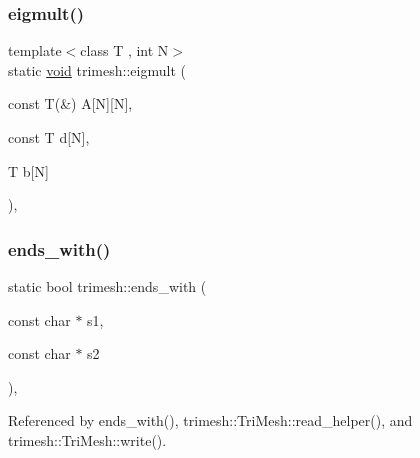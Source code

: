 \mbox{\label{namespacetrimesh_a166e0e76af0db363be9afa67f378a08f}} 
\subsubsection{\texorpdfstring{eigmult()}{eigmult()}\hspace{0.1cm}{\footnotesize\ttfamily [2/2]}}
{\footnotesize\ttfamily template$<$class T , int N$>$ \\
static \hyperlink{namespacetrimesh_a784ddfd979e1c579bda795a8edfc3f43}{void} trimesh\+::eigmult (\begin{DoxyParamCaption}\item[{const T(\&)}]{A\mbox{[}\+N\mbox{]}\mbox{[}\+N\mbox{]},  }\item[{const T}]{d\mbox{[}\+N\mbox{]},  }\item[{T}]{b\mbox{[}\+N\mbox{]} }\end{DoxyParamCaption})\hspace{0.3cm}{\ttfamily [inline]}, {\ttfamily [static]}}

\mbox{\label{namespacetrimesh_a926d2d6035db34c335f52af68daa3238}} 
\subsubsection{\texorpdfstring{ends\+\_\+with()}{ends\_with()}\hspace{0.1cm}{\footnotesize\ttfamily [1/2]}}
{\footnotesize\ttfamily static bool trimesh\+::ends\+\_\+with (\begin{DoxyParamCaption}\item[{const char $\ast$}]{s1,  }\item[{const char $\ast$}]{s2 }\end{DoxyParamCaption})\hspace{0.3cm}{\ttfamily [inline]}, {\ttfamily [static]}}



Referenced by ends\+\_\+with(), trimesh\+::\+Tri\+Mesh\+::read\+\_\+helper(), and trimesh\+::\+Tri\+Mesh\+::write().

\mbox{\label{namespacetrimesh_a83cec2fde835ac957834a5bebd7ed71e}} 
